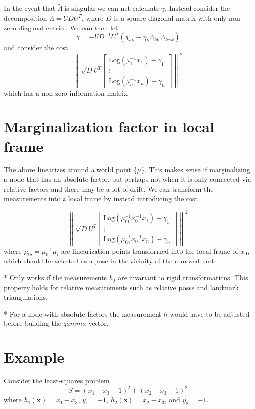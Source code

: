In the event that $\tilde \Lambda$ is singular we can not calculate $\gamma$. Instead consider the decomposition $\tilde \Lambda = U D U^T$, where $D$ is a square diagonal matrix with only non-zero diagonal entries. We can then let
$$
  \gamma = -U D^{-1} U^T \left( \eta_{\lnot k} - \eta_k \Lambda_{kk}^{-1} \Lambda_{k \lnot k} \right)
$$
and consider the cost
$$
  \left\| \sqrt{D} U^T \begin{bmatrix}
    \mathrm{Log}(\mu_1^{-1} x_1) - \gamma_1 \\
    \vdots \\
    \mathrm{Log}(\mu_n^{-1} x_n) - \gamma_n
  \end{bmatrix} \right\|^2
$$
which has a non-zero information matrix.

\section{Marginalization factor in local frame}

The above linearizes around a world point $\{ \mu \}$. This makes sense if marginalizing a node that has an absolute factor, but perhaps not when it is only connected via relative factors and there may be a lot of drift. We can transform the measurements into a local frame by instead introducing the cost

$$
\left\| \sqrt{D} U^T \begin{bmatrix}
  \mathrm{Log}(\mu_{01}^{-1} x_0^{-1} x_1) - \gamma_1 \\
  \vdots \\
  \mathrm{Log}( \mu_{0n}^{-1} x_0^{-1} x_n) - \gamma_n
\end{bmatrix} \right\|^2
$$
where $\mu_{0i} = \mu_0^{-1} \mu_i$ are linearization points transformed into the local frame of $x_0$, which should be selected as a pose in the vicinity of the removed node.

* Only works if the measurements $h_j$ are invariant to rigid transformations. This property holds for relative measurements such as relative poses and landmark triangulations.

* For a node with absolute factors the measurement $h$ would have to be adjusted before building the $gamma$ vector.

\section{Example}

Consider the least-squares problem 
$$
  S = (x_1 - x_3 + 1)^2 + (x_2 - x_3 + 1)^2
$$
where $h_1(\mathbf{x}) = x_1 - x_3$, $y_1 = -1$, $h_2(\mathbf{x}) = x_2 - x_3$, and $y_2 = -1$.

